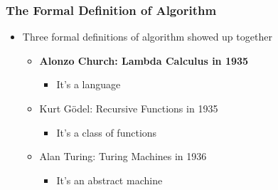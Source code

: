 \documentclass[aspectratio=169,10pt]{beamer}
\begin{document}
\begin{frame}
  \frametitle{The Formal Definition of Algorithm}
  \begin{itemize}
    \item Three formal definitions of algorithm showed up together
          \begin{itemize}
            \item \textbf{Alonzo Church: Lambda Calculus in 1935}
                  \begin{itemize}
                    \item It's a language
                  \end{itemize}
                  \begin{figure}
                  \end{figure}
            \item Kurt Gödel: Recursive Functions in 1935
                  \begin{itemize}
                    \item It's a class of functions
                  \end{itemize}
                  \begin{figure}
                  \end{figure}
            \item Alan Turing: Turing Machines in 1936
                  \begin{itemize}
                    \item It's an abstract machine
                  \end{itemize}
                  \begin{figure}
                  \end{figure}
          \end{itemize}
  \end{itemize}
\end{frame}
\end{document}
